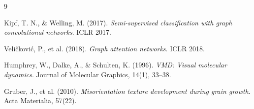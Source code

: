 \documentclass[12pt, a4paper]{article}
\begin{document}
\begin{thebibliography}{9}

Kipf, T. N., \& Welling, M. (2017).
\textit{Semi-supervised classification with graph convolutional networks}.
ICLR 2017.

Veličković, P., et al. (2018).
\textit{Graph attention networks}.
ICLR 2018.

Humphrey, W., Dalke, A., \& Schulten, K. (1996).
\textit{VMD: Visual molecular dynamics}.
Journal of Molecular Graphics, 14(1), 33--38.

Gruber, J., et al. (2010).
\textit{Misorientation texture development during grain growth}.
Acta Materialia, 57(22).

\end{thebibliography}
\end{document}
